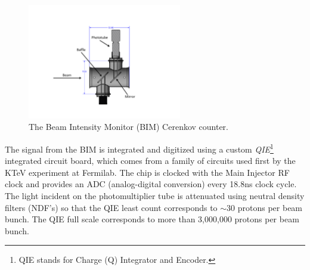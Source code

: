 \begin{figure}
\begin{center}
\includegraphics[width=0.6\textwidth]{figures/BIMCerenkov.pdf}
\caption{The Beam Intensity Monitor (BIM) Cerenkov counter.}
\label{fig:BIMCerenkov}
\end{center}
\end{figure}

The signal from the BIM is integrated and digitized using a custom \emph{QIE}\footnote{QIE stands for Charge (Q) Integrator and Encoder.} integrated circuit board, which comes from a family of circuits used first by the KTeV experiment at Fermilab\cite{QIE}.  The chip is clocked with the Main Injector RF clock and provides an ADC (analog-digital conversion) every 18.8ns clock cycle.  The light incident on the photomultiplier tube is attenuated using neutral density filters (NDF's) so that the QIE least count corresponds to $\sim$30 protons per beam bunch.  The QIE full scale corresponds to more than 3,000,000 protons per beam bunch. 

